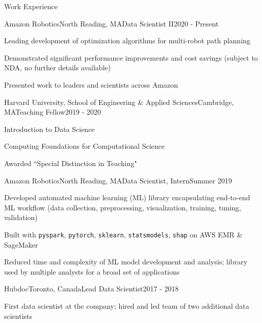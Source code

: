\documentclass{resume} %
\begin{document}
\begin{rSection}{Work Experience}

\begin{rSubsection}{Amazon Robotics}{North Reading, MA}{Data Scientist II}{2020 - Present}
	\item Leading development of optimization algorithms for multi-robot path planning
	\item Demonstrated significant performance improvements and cost savings (subject to NDA, no further details available)
	\item Presented work to leaders and scientists across Amazon
\end{rSubsection}
\begin{rSubsection}{Harvard University, School of Engineering \& Applied Sciences}{Cambridge, MA}{Teaching Fellow}{2019 - 2020}
	\item Introduction to Data Science
	\item Computing Foundations for Computational Science
	\item Awarded ``Special Distinction in Teaching"
\end{rSubsection}
\begin{rSubsection}{Amazon Robotics}{North Reading, MA}{Data Scientist, Intern}{Summer 2019}
	\item Developed automated machine learning (ML) library encapsulating end-to-end ML workflow (data collection, preprocessing, visualization, training, tuning, validation)
	\item Built with \texttt{pyspark}, \texttt{pytorch}, \texttt{sklearn}, \texttt{statsmodels}, \texttt{shap} on AWS EMR \& SageMaker
	\item Reduced time and complexity of ML model development and analysis; library used by multiple analysts for a broad set of applications
\end{rSubsection}
\begin{rSubsection}{Hubdoc}{Toronto, Canada}{Lead Data Scientist}{2017 - 2018}
	\item First data scientist at the company; hired and led team of two additional data scientists

\end{rSubsection}
\end{rSection}
\end{document}
